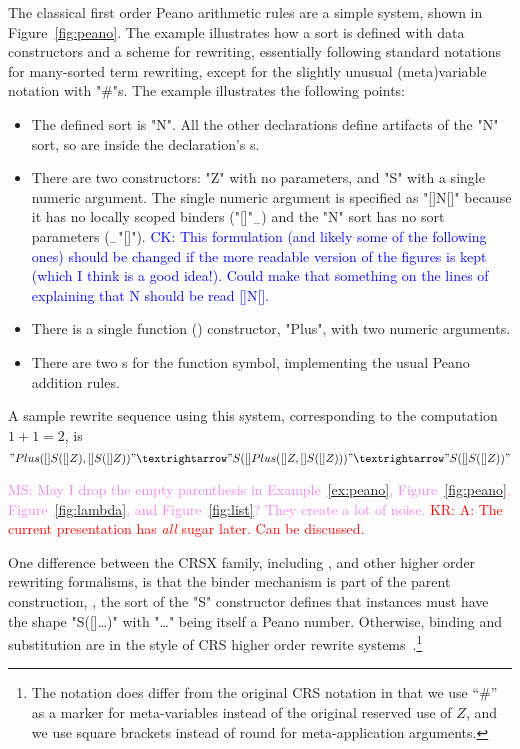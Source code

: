 \documentclass[letterpaper,11pt]{article}
\newcommand{\CK}[1]{\textcolor{blue}{CK: #1}}
\newcommand{\KR}[1]{\textcolor{red}{KR: #1}}
\newcommand{\MS}[1]{\textcolor{violet}{MS: #1}}
\begin{document}
\begin{example}[Peano]\label{ex:peano}
  The classical first order Peano arithmetic rules are a simple \hax system, shown in
  Figure~\ref{fig:peano}.  The example illustrates how a sort is defined with data constructors and
  a scheme for rewriting, essentially following standard notations for many-sorted term rewriting,
  except for the slightly unusual (meta)variable notation with "#"s. The example illustrates the
  following points:
  \begin{itemize}

  \item The defined sort is "N". All the other declarations define artifacts of the "N" sort, so are
    inside the  declaration's \kw{\{\}}s.

  \item There are two  constructors: "Z" with no parameters, and "S" with a single numeric
    argument. The single numeric argument is specified as "[]N[]" because it has no locally scoped
    binders ("[]"$_-$) and the "N" sort has no sort parameters ($_-$"[]").
    \CK{This formulation (and likely some of the following ones) should be changed if the
    more readable version of the figures is kept (which I think is a good idea!).  Could make that
    something on the lines of explaining that N should be read []N[].}

  \item There is a single function () constructor, "Plus", with two numeric arguments.

  \item There are two s for the function symbol, implementing the usual Peano addition rules.

  \end{itemize}
  A sample rewrite sequence using this system, corresponding to the computation $1+1=2$, is
  \begin{displaymath}
    "Plus([]S([]Z), []S([]Z))" →
    "S([]Plus([]Z, []S([]Z)))" →
    "S([]S([]Z))"
  \end{displaymath}
\end{example}
\MS{May I drop the empty parenthesis in Example~\ref{ex:peano}, Figure~\ref{fig:peano},
  Figure~\ref{fig:lambda}, and Figure~\ref{fig:list}? They create a lot of noise.}
\KR{A: The current presentation has \emph{all} sugar later. Can be discussed.} 

\begin{remark}
  One difference between the CRSX family, including \hax, and other higher order rewriting
  formalisms, is that the binder mechanism is part of the parent construction, \eg, the sort of the
  "S" constructor defines that instances must have the shape "S([]…)" with "…" being itself a Peano
  number.  Otherwise, binding and substitution are in the style of CRS higher order rewrite
  systems~\cite{Klop+:tcs1993}.\footnote{The notation does differ from the original CRS notation in
    that we use ``\#'' as a marker for meta-variables instead of the original reserved use of $Z$,
    and we use square brackets instead of round for meta-application arguments.}
\end{remark}
\end{document}
